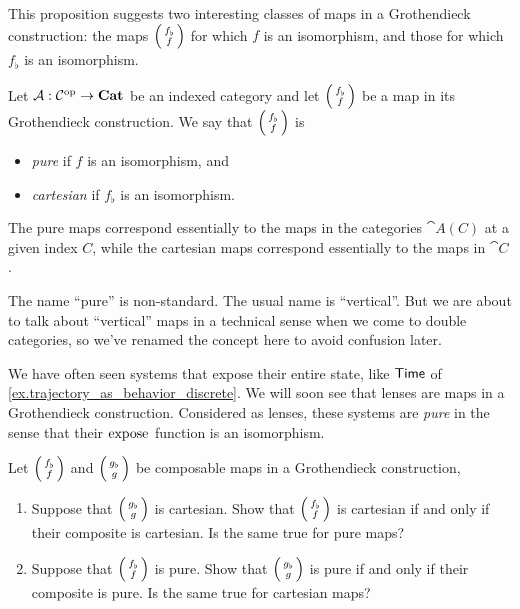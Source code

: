 \documentclass[DynamicalBook]{subfiles}
\begin{document}
This proposition suggests two interesting classes of maps in a Grothendieck
construction: the maps $\lens{f_{\flat}}{f}$ for which $f$ is an isomorphism, and
those for which $f_{\flat}$ is an isomorphism.
\begin{definition}\label{def.pure_and_cartesian}
Let $\mathcal{A} : \mathcal{C}^{\textnormal{op}} \to \textbf{Cat}$ be an indexed category and let
$\lens{f_{\flat}}{f}$ be a map in its Grothendieck construction. We say that
$\lens{f_{\flat}}{f}$ is
\begin{itemize}
\item \emph{pure} if $f$ is an isomorphism, and
\item \emph{cartesian} if $f_{\flat}$ is an isomorphism.
\end{itemize}
\end{definition}

The pure maps correspond essentially to the maps in the categories $\cat{A}(C)$
at a given index $C$, while the cartesian maps correspond essentially to the
maps in $\cat{C}$.

\begin{remark}
  The name ``pure'' is non-standard. The usual name is ``vertical''. But we are
  about to talk about ``vertical'' maps in a technical sense when we come to
  double categories, so we've renamed the concept here to avoid confusion later.
\end{remark}

\begin{example}
  We have often seen systems that expose their entire state, like $\mathsf{Time}$ 
  of \cref{ex.trajectory_as_behavior_discrete}. We will soon see that lenses are maps in a Grothendieck construction. Considered as lenses, these systems are
  \emph{pure} in the sense that their $\mathrm{expose}_{\mathsf{}}$ function is an isomorphism.
\end{example}

\begin{exercise}\label{ex.2-of-3_for_pure_cartesian}
  Let $\lens{f_{\flat}}{f}$ and $\lens{g_{\flat}}{g}$ be composable maps in a Grothendieck construction,
  \begin{enumerate}
    \item Suppose that $\lens{g_{\flat}}{g}$ is cartesian.  Show that
      $\lens{f_{\flat}}{f}$ is cartesian if and only if their composite is
      cartesian. Is the same true for pure maps?
    \item Suppose that $\lens{f_{\flat}}{f}$ is pure. Show that
      $\lens{g_{\flat}}{g}$ is pure if and only if their composite is pure. Is
      the same true for cartesian maps?
  \end{enumerate}
\end{exercise}
\end{document}
